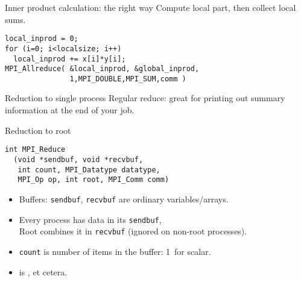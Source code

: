\begin{numberedframe}{Inner product calculation: the right way}
  Compute local part, then collect local sums.

\lstset{language=C}
\begin{lstlisting}
local_inprod = 0;
for (i=0; i<localsize; i++)
  local_inprod += x[i]*y[i];
MPI_Allreduce( &local_inprod, &global_inprod, 
               1,MPI_DOUBLE,MPI_SUM,comm )
\end{lstlisting}
\end{numberedframe}

\begin{optexerciseframe}
  
\end{optexerciseframe}

\begin{numberedframe}{Reduction to single process}
    Regular reduce: great for printing out summary information at the
  end of your job.
\end{numberedframe}

\begin{numberedframe}{Reduction to root}
\lstset{language=C}
\begin{lstlisting}
int MPI_Reduce
  (void *sendbuf, void *recvbuf,
   int count, MPI_Datatype datatype, 
   MPI_Op op, int root, MPI_Comm comm)
\end{lstlisting}
\begin{itemize}
\item Buffers: \lstinline{sendbuf}, \lstinline{recvbuf} are ordinary variables/arrays.
\item Every process has data in its \lstinline{sendbuf},\\
  Root combines it in \lstinline{recvbuf} (ignored on non-root processes).
\item \lstinline{count} is number of items in the buffer: 1~for scalar.
\item {} is ,  et cetera.
\end{itemize}
\end{numberedframe}

